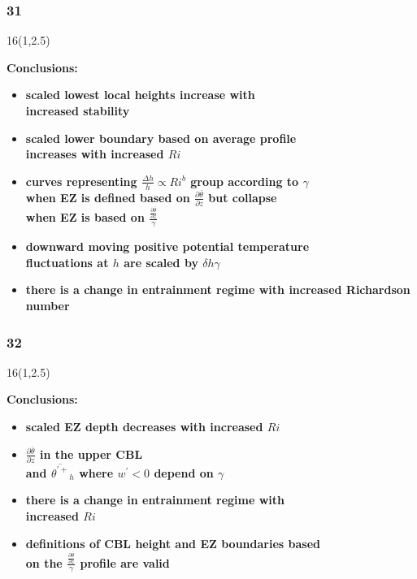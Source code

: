 \documentclass{beamer}
\newcommand\FrameText[1]{
\begin{textblock}{16}(1,2.5)
\raggedright #1
\end{textblock}}
\begin{document}
\begin{frame}
\frametitle{31}
\FrameText{\bf{\large Conclusions:}
\vspace{2.8mm}
\begin{itemize}
\item \bf{\large scaled lowest local heights increase with\\
 increased stability}
\vspace{2.8mm}
\item \bf{\large scaled lower boundary based on average profile\\
increases with increased $Ri$}
\vspace{2.8mm}
\item \bf{\large curves representing  $\frac{\Delta h}{h} \propto Ri ^{b}$ group according to $\gamma$\\
when EZ is defined based on $\frac{\partial \overline{\theta}}{\partial z}$ but collapse\\
when EZ is based on $\frac{\frac{\partial \overline{\theta}}{\partial z}}{\gamma}$}
\vspace{2.8mm} 
\item \bf{\large downward moving positive potential temperature\\
fluctuations at $h$ are scaled by $\delta h \gamma$}
\vspace{2.8mm}
\item \bf{\large there is a change in entrainment regime with increased Richardson number}
\end{itemize}
}
\end{frame}

\begin{frame}
\frametitle{32}
\FrameText{\bf{\large Conclusions:}
\vspace{5mm}
\begin{itemize}
\item \bf{\large scaled EZ depth decreases with increased $Ri$}
\vspace{5mm}
\item \bf{\large $\frac{\partial \overline{\theta}}{\partial z}$ in the upper CBL\\ and  $\overline{\theta^{'+}}_{h}$ where $w^{'}<0$ depend on $\gamma$}
\vspace{5mm}
\item \bf{\large there is a change in entrainment regime with\\
increased $Ri$}
\vspace{5mm}
\item \bf{\large definitions of CBL height and EZ boundaries based\\
on the $\frac{\frac{\partial \overline{\theta}}{\partial z}}{\gamma}$ profile are valid}
\end{itemize}
}
\end{frame}
\end{document}
